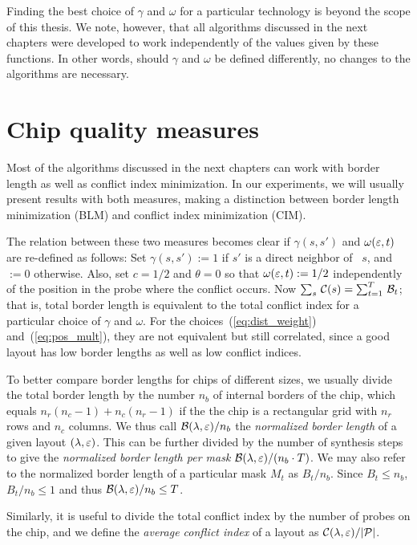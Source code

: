 Finding the best choice of $\gamma$ and $\omega$ for a particular technology is
beyond the scope of this thesis. We note, however, that all algorithms discussed
in the next chapters were developed to work independently of the values given by
these functions. In other words, should $\gamma$ and $\omega$ be defined
differently, no changes to the algorithms are necessary.

\section{Chip quality measures}
\label{sec:mlp_bl_vs_ci}

Most of the algorithms discussed in the next chapters can work with border
length as well as conflict index minimization. In our experiments, we will
usually present results with both measures, making a distinction between border
length minimization (BLM) and conflict index minimization (CIM).

The relation between these two
measures becomes clear if $\gamma(s,s')$ and $\omega(\varepsilon,t)$ are re-defined as
follows: Set $\gamma(s,s') := 1$ if $s'$ is a direct neighbor of~ $s$, and $:=0$
otherwise. Also, set $c=1/2$ and $\theta=0$ so that $\omega(\varepsilon,t) := 1/2$
independently of the position in the probe where the conflict occurs. Now
$\sum_s\, {\mathcal{C}}(s) = \sum_{t=1}^T\, {\mathcal{B}}_t$; that is, total border length is
equivalent to the total conflict index for a particular choice of $\gamma$ and
$\omega$. For the choices~(\ref{eq:dist_weight}) and~(\ref{eq:pos_mult}), they
are not equivalent but still correlated, since a good layout has low border
lengths as well as low conflict indices.

To better compare border lengths for chips of different sizes, we usually divide
the total border length by the number $n_b$ of internal borders of the chip,
which equals $n_r(n_c - 1) + n_c(n_r - 1)$ if the the chip is a rectangular grid
with $n_r$ rows and $n_c$ columns. We thus call ${\mathcal{B}}(\lambda,\varepsilon)/n_b$ the
\emph{normalized border length} of a given layout $(\lambda,\varepsilon)$. This can be
further divided by the number of synthesis steps to give the \emph{normalized
border length per mask} ${\mathcal{B}}(\lambda,\varepsilon)/(n_b \cdot T)$. We may also refer
to the normalized border length of a particular mask $M_t$ as $B_t/n_b$. Since
$B_t \leq n_b$, $B_t/n_b \leq 1$ and thus ${\mathcal{B}}(\lambda,\varepsilon)/n_b \leq T$.

Similarly, it is useful to divide the total conflict index by the number of
probes on the chip, and we define the \emph{average conflict index} of a layout
as ${\mathcal{C}}(\lambda,\varepsilon)/|{\mathcal{P}}|$.

